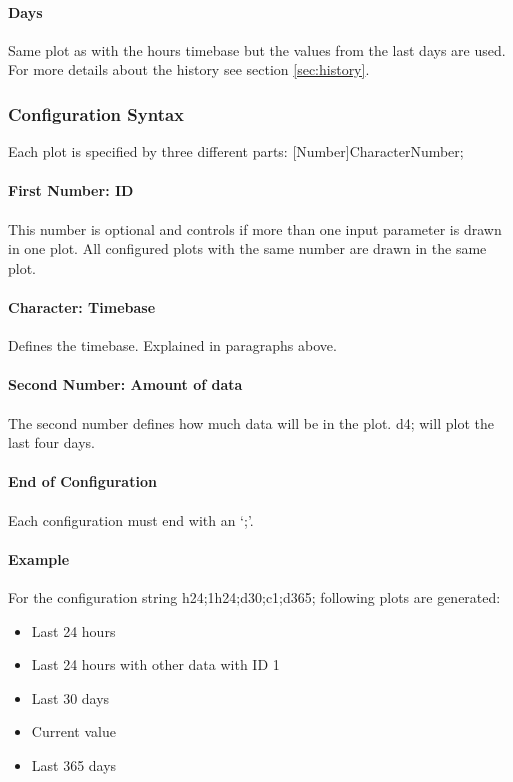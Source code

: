 \paragraph{Days} %
\label{par:days}
Same plot as with the hours timebase but the values from the last days are used. For more details about the history see section \ref{sec:history}.

\subsubsection{Configuration Syntax} %
\label{ssub:configuration_syntax}
Each plot is specified by three different parts: [Number]CharacterNumber;

\paragraph{First Number: ID} %
\label{par:first_number_id}
This number is optional and controls if more than one input parameter is drawn in one plot. All configured plots with the same number are drawn in the same plot.
\paragraph{Character: Timebase} %
\label{par:character}
Defines the timebase. Explained in paragraphs above.
\paragraph{Second Number: Amount of data} %
\label{par:number}
The second number defines how much data will be in the plot. {\C d4;} will plot the last four days.
\paragraph{End of Configuration} %
\label{par:end_of_configuration}
Each configuration must end with an {\C `;'}.

\paragraph{Example} %
\label{par:example}
For the configuration string {\C h24;1h24;d30;c1;d365;} following plots are generated:
\begin{itemize}
	\item Last 24 hours
	\item Last 24 hours with other data with ID 1 
	\item Last 30 days
	\item Current value
	\item Last 365 days
\end{itemize}

